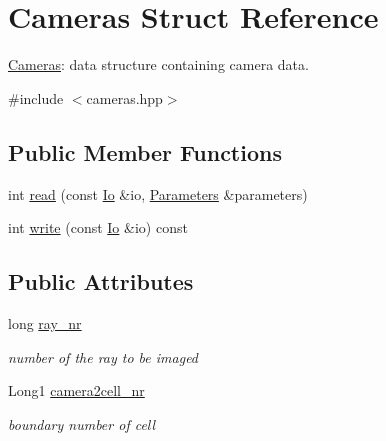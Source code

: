 \hypertarget{structCameras}{}\section{Cameras Struct Reference}
\label{structCameras}


\mbox{\hyperlink{structCameras}{Cameras}}\+: data structure containing camera data.  




{\ttfamily \#include $<$cameras.\+hpp$>$}

\subsection*{Public Member Functions}
\begin{DoxyCompactItemize}
\item 
int \mbox{\hyperlink{structCameras_a33ff81222cb236e74bc4ce5608d5754f}{read}} (const \mbox{\hyperlink{structIo}{Io}} \&io, \mbox{\hyperlink{classParameters}{Parameters}} \&parameters)
\item 
int \mbox{\hyperlink{structCameras_afb2e28b767eccf3ff82685e99d510ebc}{write}} (const \mbox{\hyperlink{structIo}{Io}} \&io) const
\end{DoxyCompactItemize}
\subsection*{Public Attributes}
\begin{DoxyCompactItemize}
\item 
\mbox{\label{structCameras_a556591a0ccae7d1a28eb7ad3ef574560}} 
long \mbox{\hyperlink{structCameras_a556591a0ccae7d1a28eb7ad3ef574560}{ray\+\_\+nr}}
\begin{DoxyCompactList}\small\item\em number of the ray to be imaged \end{DoxyCompactList}\item 
\mbox{\label{structCameras_abe1dd71aa1aabd1dfdc9e2abd11b219c}} 
Long1 \mbox{\hyperlink{structCameras_abe1dd71aa1aabd1dfdc9e2abd11b219c}{camera2cell\+\_\+nr}}
\begin{DoxyCompactList}\small\item\em boundary number of cell \end{DoxyCompactList}\end{DoxyCompactItemize}


